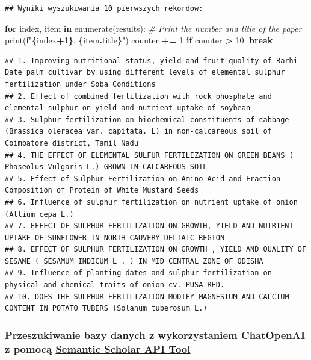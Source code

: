 \documentclass[
  12pt,
]{article}
\newenvironment{Shaded}{\begin{snugshade}}{\end{snugshade}}
\newcommand{\BuiltInTok}[1]{#1}
\newcommand{\CommentTok}[1]{\textcolor[rgb]{0.56,0.35,0.01}{\textit{#1}}}
\newcommand{\ControlFlowTok}[1]{\textcolor[rgb]{0.13,0.29,0.53}{\textbf{#1}}}
\newcommand{\DecValTok}[1]{\textcolor[rgb]{0.00,0.00,0.81}{#1}}
\newcommand{\KeywordTok}[1]{\textcolor[rgb]{0.13,0.29,0.53}{\textbf{#1}}}
\newcommand{\NormalTok}[1]{#1}
\newcommand{\OperatorTok}[1]{\textcolor[rgb]{0.81,0.36,0.00}{\textbf{#1}}}
\newcommand{\SpecialCharTok}[1]{\textcolor[rgb]{0.81,0.36,0.00}{\textbf{#1}}}
\newcommand{\SpecialStringTok}[1]{\textcolor[rgb]{0.31,0.60,0.02}{#1}}
\begin{document}
\begin{verbatim}
## Wyniki wyszukiwania 10 pierwszych rekordów:
\end{verbatim}

\begin{Shaded}
\begin{Highlighting}[]
\ControlFlowTok{for}\NormalTok{ index, item }\KeywordTok{in} \BuiltInTok{enumerate}\NormalTok{(results):}
    \CommentTok{\# Print the number and title of the paper}
    \BuiltInTok{print}\NormalTok{(}\SpecialStringTok{f"}\SpecialCharTok{\{}\NormalTok{index}\OperatorTok{+}\DecValTok{1}\SpecialCharTok{\}}\SpecialStringTok{. }\SpecialCharTok{\{}\NormalTok{item}\SpecialCharTok{.}\NormalTok{title}\SpecialCharTok{\}}\SpecialStringTok{"}\NormalTok{)}
\NormalTok{    counter }\OperatorTok{+=} \DecValTok{1}
    \ControlFlowTok{if}\NormalTok{ counter }\OperatorTok{\textgreater{}} \DecValTok{10}\NormalTok{:}
        \ControlFlowTok{break}
\end{Highlighting}
\end{Shaded}

\begin{verbatim}
## 1. Improving nutritional status, yield and fruit quality of Barhi Date palm cultivar by using different levels of elemental sulphur fertilization under Soba Conditions
## 2. Effect of combined fertilization with rock phosphate and elemental sulphur on yield and nutrient uptake of soybean
## 3. Sulphur fertilization on biochemical constituents of cabbage (Brassica oleracea var. capitata. L) in non-calcareous soil of Coimbatore district, Tamil Nadu
## 4. THE EFFECT OF ELEMENTAL SULFUR FERTILIZATION ON GREEN BEANS ( Phaseolus Vulgaris L.) GROWN IN CALCAREOUS SOIL
## 5. Effect of Sulphur Fertilization on Amino Acid and Fraction Composition of Protein of White Mustard Seeds
## 6. Influence of sulphur fertilization on nutrient uptake of onion (Allium cepa L.)
## 7. EFFECT OF SULPHUR FERTILIZATION ON GROWTH, YIELD AND NUTRIENT UPTAKE OF SUNFLOWER IN NORTH CAUVERY DELTAIC REGION -
## 8. EFFECT OF SULPHUR FERTILIZATION ON GROWTH , YIELD AND QUALITY OF SESAME ( SESAMUM INDICUM L . ) IN MID CENTRAL ZONE OF ODISHA
## 9. Influence of planting dates and sulphur fertilization on physical and chemical traits of onion cv. PUSA RED.
## 10. DOES THE SULPHUR FERTILIZATION MODIFY MAGNESIUM AND CALCIUM CONTENT IN POTATO TUBERS (Solanum tuberosum L.)
\end{verbatim}

\hypertarget{przeszukiwanie-bazy-danych-z-wykorzystaniem-chatopenai-z-pomocux105-semantic-scholar-api-tool}{%
\subsubsection{\texorpdfstring{Przeszukiwanie bazy danych z
wykorzystaniem \href{https://platform.openai.com/apps}{ChatOpenAI} z
pomocą
\href{https://python.langchain.com/docs/integrations/tools/semanticscholar}{Semantic
Scholar API
Tool}}{Przeszukiwanie bazy danych z wykorzystaniem ChatOpenAI z pomocą Semantic Scholar API Tool}}\label{przeszukiwanie-bazy-danych-z-wykorzystaniem-chatopenai-z-pomocux105-semantic-scholar-api-tool}}
\end{document}
